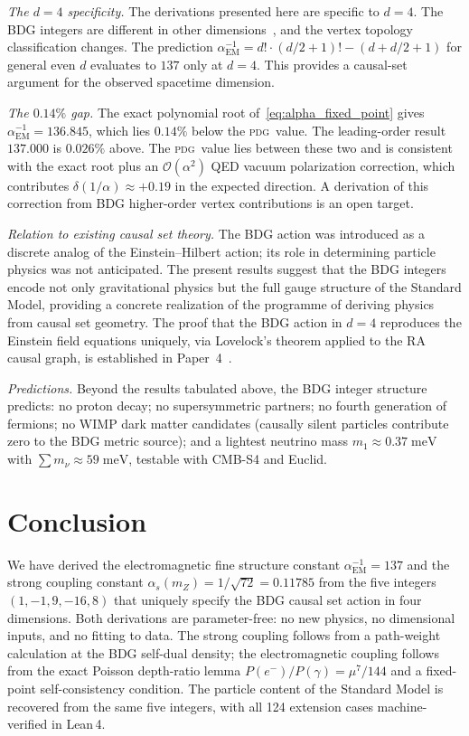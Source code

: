\documentclass[11pt,twocolumn]{article}
\newcommand{\alphas}{\alpha_s}
\newcommand{\alphaEM}{\alpha_{\mathrm{EM}}}
\newcommand{\PDG}{\textsc{pdg}}
\begin{document}
\smallskip\noindent\textit{The $d=4$ specificity.}
The derivations presented here are specific to $d=4$.
The BDG integers are different in other dimensions~\cite{Glaser2014},
and the vertex topology classification changes.
The prediction $\alphaEM^{-1} = d!\cdot(d/2{+}1)! - (d + d/2{+}1)$
for general even $d$ evaluates to $137$ only at $d=4$.
This provides a causal-set argument for the observed spacetime dimension.

\smallskip\noindent\textit{The $0.14\%$ gap.}
The exact polynomial root of~\eqref{eq:alpha_fixed_point} gives
$\alphaEM^{-1} = 136.845$, which lies $0.14\%$ below the \PDG\ value.
The leading-order result $137.000$ is $0.026\%$ above.
The \PDG\ value lies between these two and is consistent with
the exact root plus an $\mathcal{O}(\alpha^2)$ QED vacuum polarization
correction, which contributes $\delta(1/\alpha) \approx +0.19$
in the expected direction.
A derivation of this correction from BDG higher-order vertex
contributions is an open target.

\smallskip\noindent\textit{Relation to existing causal set theory.}
The BDG action was introduced as a discrete analog of the
Einstein--Hilbert action; its role in determining particle physics
was not anticipated. The present results suggest that the BDG
integers encode not only gravitational physics but the full gauge
structure of the Standard Model, providing a concrete realization
of the programme of deriving physics from causal set geometry.
The proof that the BDG action in $d=4$ reproduces the Einstein
field equations uniquely, via Lovelock's theorem applied to the
RA causal graph, is established in Paper~4~\cite{Sandeman2026P4}.

\smallskip\noindent\textit{Predictions.}
Beyond the results tabulated above, the BDG integer structure predicts:
no proton decay; no supersymmetric partners; no fourth generation of
fermions; no WIMP dark matter candidates (causally silent particles
contribute zero to the BDG metric source); and a lightest neutrino
mass $m_1 \approx 0.37\;\mathrm{meV}$ with
$\sum m_\nu \approx 59\;\mathrm{meV}$, testable with CMB-S4 and Euclid.

\section{Conclusion}

We have derived the electromagnetic fine structure constant
$\alphaEM^{-1} = 137$ and the strong coupling constant
$\alphas(m_Z) = 1/\!\sqrt{72} = 0.11785$ from the five integers
$(1,-1,9,-16,8)$ that uniquely specify the BDG causal set action
in four dimensions. Both derivations are parameter-free: no new
physics, no dimensional inputs, and no fitting to data.
The strong coupling follows from a path-weight calculation at
the BDG self-dual density; the electromagnetic coupling follows
from the exact Poisson depth-ratio lemma
$P(e^-)/P(\gamma) = \mu^7/144$ and a fixed-point self-consistency
condition. The particle content of the Standard Model is
recovered from the same five integers, with all 124 extension
cases machine-verified in Lean\,4.
\end{document}
